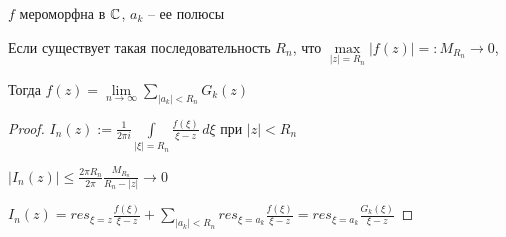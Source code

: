 \begin{theorem}\thmslashn
	
	$f$ мероморфна в $\mathbb{C}$, $a_k$ -- ее полюсы
	
	Если существует такая последовательность $R_n$, что $\max\limits_{|z| = R_n}|f(z)| =: M_{R_n} \to 0$, 
	
	Тогда  $f(z) = \lim\limits_{n \to \infty} \sum\limits_{|a_k| < R_n} G_k(z)$
	
\end{theorem}

\begin{proof}\thmslashn
	
	$I_n(z):= \frac{1}{2\pi i} \int\limits_{|\xi| = R_n} \frac{f(\xi)}{\xi - z} \,d\xi$ при $|z| < R_n$
	
	$|I_n(z)| \leqslant \frac{2\pi R_n}{2\pi} \frac{M_{R_n}}{R_n - |z|} \to 0$
	
	$I_n(z) = res_{\xi = z} \frac{f(\xi)}{\xi - z} + \sum\limits_{|a_k| < R_n} res_{\xi = a_k} \frac{f(\xi)}{\xi - z} = res_{\xi = a_k} \frac{G_k(\xi)}{\xi - z}$
	
\end{proof}

